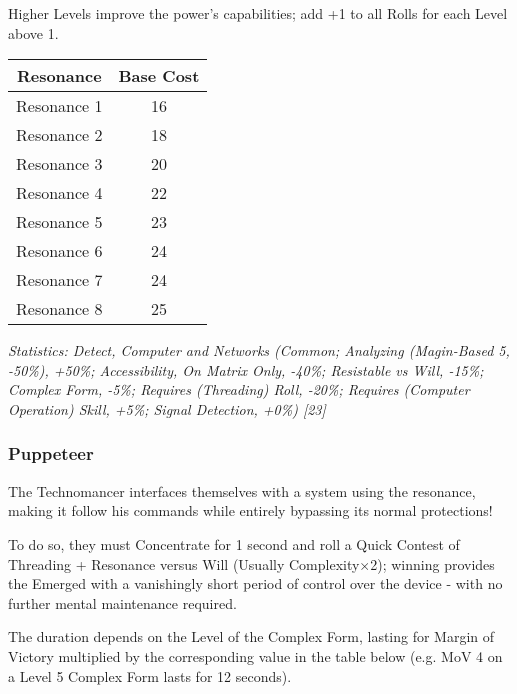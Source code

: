 \begin{multicols*}{3}
	Higher Levels improve the power's capabilities; add +1 to all Rolls for each Level above 1.
	
	\begin{center}
		\begin{tabular}{|c|c|}
			\hline
			Resonance & Base Cost\\
			\hline
			\hline
			Resonance 1 & 16  \\
			Resonance 2 & 18 \\
			Resonance 3 & 20 \\
			Resonance 4 & 22 \\
			Resonance 5 & 23 \\
			Resonance 6 & 24 \\
			Resonance 7 & 24 \\
			Resonance 8 & 25 \\
			\hline
		\end{tabular}
	\end{center}
	
	\textcolor{OliveGreen}{\textit{Statistics: Detect, Computer and Networks (Common; Analyzing (Magin-Based 5, -50\%), +50\%; Accessibility, On Matrix Only, -40\%; Resistable vs Will, -15\%; Complex Form, -5\%; Requires (Threading) Roll, -20\%; Requires (Computer Operation) Skill, +5\%; Signal Detection, +0\%) [23]}}
	
	\subsubsection*{Puppeteer}\label{puppeteer}
	
	The Technomancer interfaces themselves with a system using the resonance, making it follow his commands while entirely bypassing its normal protections!
	
	To do so, they must Concentrate for 1 second and roll a Quick Contest of Threading + Resonance versus Will (Usually Complexity$\times$2); winning provides the Emerged with a vanishingly short period of control over the device - with no further mental maintenance required.
	
	The duration depends on the Level of the Complex Form, lasting for Margin of Victory multiplied by the corresponding value in the table below (e.g. MoV 4 on a Level 5 Complex Form lasts for 12 seconds).
	

\end{multicols*}
